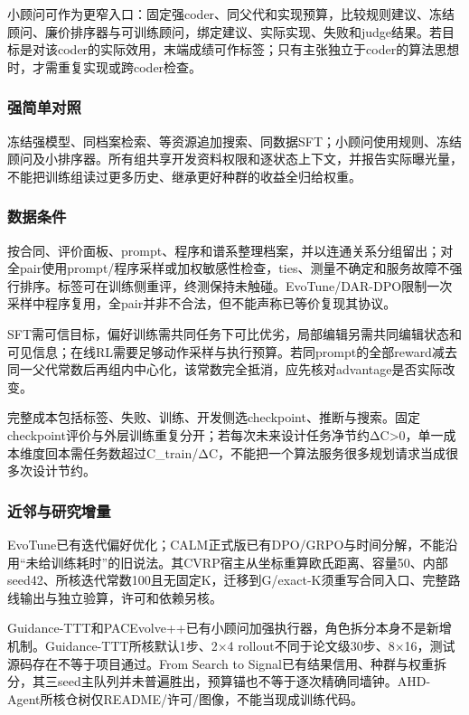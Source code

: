 \documentclass[11pt,a4paper]{article}
\newcommand{\bodytext}[1]{#1\par}
\begin{document}
\bodytext{小顾问可作为更窄入口：固定强coder、同父代和实现预算，比较规则建议、冻结顾问、廉价排序器与可训练顾问，绑定建议、实际实现、失败和judge结果。若目标是对该coder的实际效用，末端成绩可作标签；只有主张独立于coder的算法思想时，才需重复实现或跨coder检查。}
\subsubsection{强简单对照}
\bodytext{冻结强模型、同档案检索、等资源追加搜索、同数据SFT；小顾问使用规则、冻结顾问及小排序器。所有组共享开发资料权限和逐状态上下文，并报告实际曝光量，不能把训练组读过更多历史、继承更好种群的收益全归给权重。}
\subsubsection{数据条件}
\bodytext{按合同、评价面板、prompt、程序和谱系整理档案，并以连通关系分组留出；对全pair使用prompt/\allowbreak{}程序采样或加权敏感性检查，ties、测量不确定和服务故障不强行排序。标签可在训练侧重评，终测保持未触碰。EvoTune/\allowbreak{}DAR-DPO限制一次采样中程序复用，全pair并非不合法，但不能声称已等价复现其协议。}
\bodytext{SFT需可信目标，偏好训练需共同任务下可比优劣，局部编辑另需共同编辑状态和可见信息；在线RL需要足够动作采样与执行预算。若同prompt的全部reward减去同一父代常数后再组内中心化，该常数完全抵消，应先核对advantage是否实际改变。}
\bodytext{完整成本包括标签、失败、训练、开发侧选checkpoint、推断与搜索。固定checkpoint评价与外层训练重复分开；若每次未来设计任务净节约ΔC>0，单一成本维度回本需任务数超过C\_\allowbreak{}train/\allowbreak{}ΔC，不能把一个算法服务很多规划请求当成很多次设计节约。}
\subsubsection{近邻与研究增量}
\bodytext{EvoTune已有迭代偏好优化；CALM正式版已有DPO/\allowbreak{}GRPO与时间分解，不能沿用“未给训练耗时”的旧说法。其CVRP宿主从坐标重算欧氏距离、容量50、内部seed42、所核迭代常数100且无固定K，迁移到G/\allowbreak{}exact-K须重写合同入口、完整路线输出与独立验算，许可和依赖另核。}
\bodytext{Guidance-TTT和PACEvolve++已有小顾问加强执行器，角色拆分本身不是新增机制。Guidance-TTT所核默认1步、2×4 rollout不同于论文级30步、8×16，测试源码存在不等于项目通过。From Search to Signal已有结果信用、种群与权重拆分，其三seed主队列并未普遍胜出，预算锚也不等于逐次精确同墙钟。AHD-Agent所核仓树仅README/\allowbreak{}许可/\allowbreak{}图像，不能当现成训练代码。}
\end{document}
